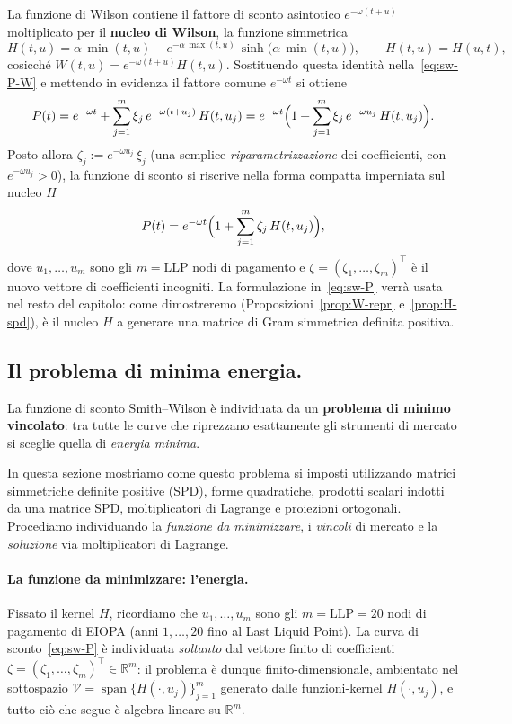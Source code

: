 \documentclass[11pt,a4paper]{article}
\theoremstyle{plain}
\theoremstyle{definition}
\theoremstyle{remark}
\newcommand{\LLP}{\ensuremath{\mathrm{LLP}}}
\newcommand{\transp}{^{\!\top}}
\begin{document}
La funzione di Wilson contiene il fattore di sconto asintotico $e^{-\omega(t+u)}$ moltiplicato
per il \textbf{nucleo di Wilson}, la funzione simmetrica
\[
  H(t,u) = \alpha\,\min(t,u) - e^{-\alpha\,\max(t,u)}\,\sinh\!\bigl(\alpha\,\min(t,u)\bigr),
  \qquad H(t,u) = H(u,t),
\]
cosicch\'e $W(t,u) = e^{-\omega(t+u)}H(t,u)$. Sostituendo questa identit\`a
nella~\eqref{eq:sw-P-W} e mettendo in evidenza il fattore comune $e^{-\omega t}$ si ottiene
\[
  P(t)
  = e^{-\omega t} + \sum_{j=1}^{m} \xi_j\, e^{-\omega(t+u_j)}\,H(t,u_j)
  = e^{-\omega t}\Bigl(1 + \sum_{j=1}^{m} \xi_j\, e^{-\omega u_j}\,H(t,u_j)\Bigr).
\]
Posto allora $\zeta_j := e^{-\omega u_j}\,\xi_j$ (una semplice \emph{riparametrizzazione} dei
coefficienti, con $e^{-\omega u_j}>0$), la funzione di sconto si riscrive nella forma compatta
imperniata sul nucleo $H$
\begin{equation}
  P(t) = e^{-\omega t}\Bigl(1 + \sum_{j=1}^{m} \zeta_j\, H(t,u_j)\Bigr),
  \label{eq:sw-P}
\end{equation}
dove $u_1,\dots,u_m$ sono gli $m=\LLP$ nodi di pagamento e $\zeta=(\zeta_1,\dots,\zeta_m)\transp$
\`e il nuovo vettore di coefficienti incogniti. La formulazione in~\eqref{eq:sw-P} verr\`a usata nel
resto del capitolo: come dimostreremo (Proposizioni~\ref{prop:W-repr} e~\ref{prop:H-spd}), \`e il
nucleo $H$ a generare una matrice di Gram simmetrica definita positiva.


\subsection{Il problema di minima energia.}
\label{sec:minenergia}

La funzione di sconto Smith--Wilson \`e individuata da un \textbf{problema di minimo
vincolato}: tra tutte le curve che riprezzano esattamente gli strumenti di mercato si
sceglie quella di \emph{energia minima}.

In questa sezione mostriamo come questo problema si imposti utilizzando matrici simmetriche definite positive
(SPD), forme quadratiche, prodotti scalari indotti da una matrice SPD, moltiplicatori di
Lagrange e proiezioni ortogonali. Procediamo individuando la \emph{funzione da minimizzare}, i \emph{vincoli} di mercato
e la \emph{soluzione} via moltiplicatori di Lagrange.

\paragraph{La funzione da minimizzare: l'energia.}
Fissato il kernel $H$, ricordiamo che $u_1,\ldots,u_m$ sono gli $m=\LLP=20$ nodi di
pagamento di EIOPA (anni $1,\ldots,20$ fino al Last Liquid Point). La curva di sconto~\eqref{eq:sw-P}
\`e individuata \emph{soltanto} dal vettore finito di coefficienti $\zeta=(\zeta_1,\ldots,\zeta_m)\transp
\in\mathbb{R}^m$: il problema \`e dunque finito-dimensionale, ambientato nel sottospazio
$\mathcal{V} = \operatorname{span}\{H(\cdot,u_j)\}_{j=1}^{m}$ generato dalle funzioni-kernel
$H(\cdot,u_j)$, e tutto ci\`o che segue \`e algebra lineare su $\mathbb{R}^m$.
\end{document}
